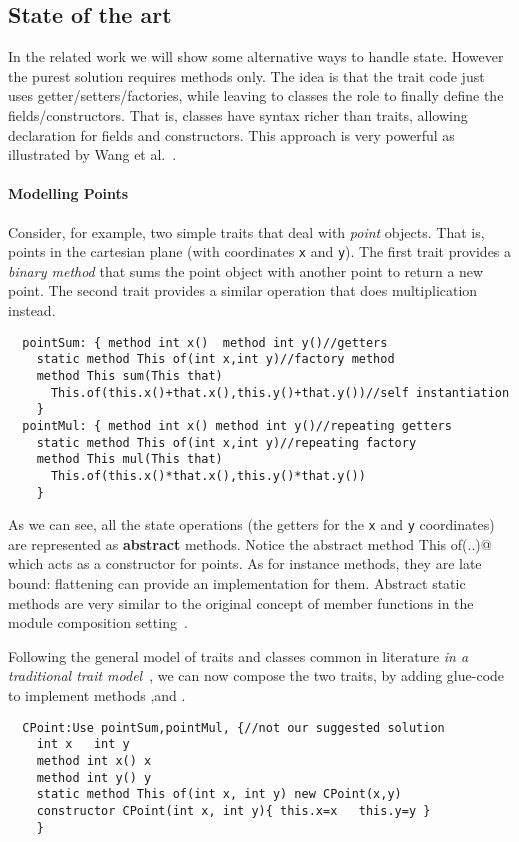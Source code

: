 \subsection{State of the art}
In the related work we will show some alternative ways to handle
state.  However the purest solution requires methods only. The idea is
that the trait code just uses getter/setters/factories, while leaving
to classes the role to finally define the fields/constructors. That
is, classes have syntax richer than traits, allowing
declaration for fields and constructors.  This approach is very
powerful as illustrated by Wang et al.~\cite{wang2016classless}.

\paragraph{Modelling Points} Consider, for example, two simple 
traits that deal with \emph{point} objects. That is, points
in the cartesian plane (with coordinates \lstinline{x} and
\lstinline{y}). The first trait provides a \emph{binary method} that 
sums the point object with another point to return a new point. 
The second trait provides a similar operation that does multiplication 
instead.
\saveSpace 
\begin{lstlisting}
  pointSum: { method int x()  method int y()//getters
    static method This of(int x,int y)//factory method
    method This sum(This that)
      This.of(this.x()+that.x(),this.y()+that.y())//self instantiation
    }
  pointMul: { method int x() method int y()//repeating getters
    static method This of(int x,int y)//repeating factory
    method This mul(This that)
      This.of(this.x()*that.x(),this.y()*that.y())
    }
\end{lstlisting}
\saveSpace
\noindent As we can see, all the state operations (the getters for the 
\lstinline{x} and \lstinline{y} coordinates) are represented as {\bf abstract} methods.
Notice the abstract \Q@static method This of(..)@ which acts as a constructor
for points. 
As for instance methods, they are late bound:  flattening can provide an implementation for them.
Abstract static methods are very similar to the original concept of member functions in the module composition setting~\cite{ancona2002calculus}.

Following the general model of traits and classes common in literature \emph{in a traditional trait model}~\cite{Traits:ECOOP2003},
we can now compose the two traits, by adding glue-code
to implement methods \Q@x@,\Q@y@ and \Q@of@.
\begin{lstlisting}
  CPoint:Use pointSum,pointMul, {//not our suggested solution
    int x   int y
    method int x() x       
    method int y() y
    static method This of(int x, int y) new CPoint(x,y)
    constructor CPoint(int x, int y){ this.x=x   this.y=y }
    }
\end{lstlisting}


